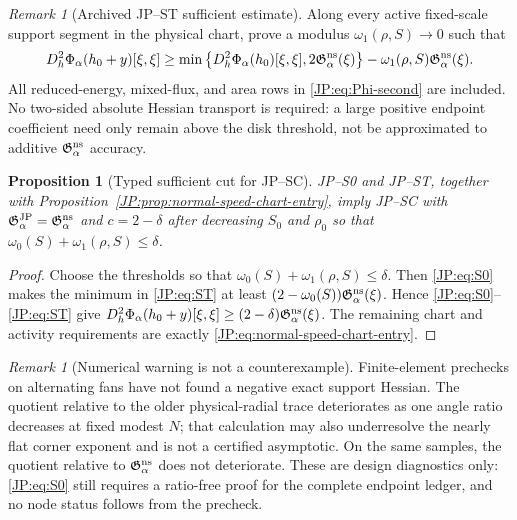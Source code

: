 \documentclass[11pt]{amsart}
\numberwithin{equation}{section}
\newtheorem{proposition}[theorem]{Proposition}
\theoremstyle{definition}
\theoremstyle{remark}
\newtheorem{remark}[theorem]{Remark}
\newcommand{\Gjp}{\mathfrak G^{\rm JP}}
\begin{document}
\begin{remark}[Archived JP--ST sufficient estimate]
\label{JP:rem:ST}
Along every active fixed-scale support segment in the physical chart,
prove a modulus $\omega_1(\rho,S)\to0$ such that
\begin{equation}\label{JP:eq:ST}
 D_h^2\Phi_\alpha(h_0+y)[\xi,\xi]
 \ge\min\left\{D_h^2\Phi_\alpha(h_0)[\xi,\xi],
                 2\mathfrak G_\alpha^{\rm ns}(\xi)\right\}
       -\omega_1(\rho,S)\mathfrak G_\alpha^{\rm ns}(\xi).
\end{equation}
All reduced-energy, mixed-flux, and area rows in
\eqref{JP:eq:Phi-second} are included.  No two-sided absolute Hessian
transport is required: a large positive endpoint coefficient need only
remain above the disk threshold, not be approximated to additive
$\mathfrak G_\alpha^{\rm ns}$ accuracy.
\end{remark}

\begin{proposition}[Typed sufficient cut for JP--SC]
\label{JP:prop:SC-cut}
JP--S0 and JP--ST, together with
Proposition~\ref{JP:prop:normal-speed-chart-entry}, imply JP--SC with
$\Gjp_\alpha=\mathfrak G_\alpha^{\rm ns}$ and
$c=2-\delta$ after decreasing $S_0$ and $\rho_0$ so that
$\omega_0(S)+\omega_1(\rho,S)\le\delta$.
\end{proposition}

\begin{proof}
Choose the thresholds so that
$\omega_0(S)+\omega_1(\rho,S)\le\delta$.  Then
\eqref{JP:eq:S0} makes the minimum in \eqref{JP:eq:ST} at least
$(2-\omega_0(S))\mathfrak G_\alpha^{\rm ns}(\xi)$.  Hence
\eqref{JP:eq:S0}--\eqref{JP:eq:ST} give
$D_h^2\Phi_\alpha(h_0+y)[\xi,\xi]
\ge(2-\delta)\mathfrak G_\alpha^{\rm ns}(\xi)$.  The remaining chart and activity
requirements are exactly \eqref{JP:eq:normal-speed-chart-entry}.
\end{proof}

\begin{remark}[Numerical warning is not a counterexample]
Finite-element prechecks on alternating fans have not found a negative
exact support Hessian.  The quotient relative to the older physical-radial
trace deteriorates as one angle ratio decreases at fixed modest $N$; that
calculation may also underresolve the nearly flat corner exponent and is
not a certified asymptotic.  On the same samples, the quotient relative to
$\mathfrak G_\alpha^{\rm ns}$ does not deteriorate.  These are design
diagnostics only: \eqref{JP:eq:S0} still requires a ratio-free proof for the
complete endpoint ledger, and no node status follows from the precheck.
\end{remark}
\end{document}
